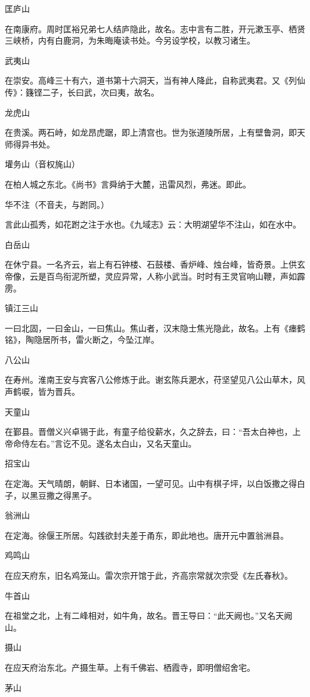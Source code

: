 \documentclass[a4paper,12pt,UTF8,twoside]{ctexbook}
\begin{document}
匡庐山

在南康府。周时匡裕兄弟七人结庐隐此，故名。志中言有二胜，开元漱玉亭、栖贤三峡桥，内有白鹿洞，为朱晦庵读书处。今另设学校，以教习诸生。

武夷山

在崇安。高峰三十有六，道书第十六洞天，当有神人降此，自称武夷君。又《列仙传》：籛铿二子，长曰武，次曰夷，故名。

龙虎山

在贵溪。两石峙，如龙昂虎踞，即上清宫也。世为张道陵所居，上有壁鲁洞，即天师得异书处。

壦务山（音权旄山）

在柏人城之东北。《尚书》言舜纳于大麓，迅雷风烈，弗迷。即此。

华不注（不音夫，与跗同。）

言此山孤秀，如花跗之注于水也。《九域志》云：大明湖望华不注山，如在水中。

白岳山

在休宁县。一名齐云，岩上有石钟楼、石鼓楼、香炉峰、烛台峰，皆奇景。上供玄帝像，云是百鸟衔泥所塑，灵应异常，人称小武当。时时有王灵官响山鞭，声如霹雳。

镇江三山

一曰北固，一曰金山，一曰焦山。焦山者，汉末隐士焦光隐此，故名。上有《瘗鹤铭》，陶隐居所书，雷火断之，今坠江岸。

八公山

在寿州。淮南王安与宾客八公修炼于此。谢玄陈兵淝水，苻坚望见八公山草木，风声鹤唳，皆为晋兵。

天童山

在鄞县。晋僧义兴卓锡于此，有童子给役薪水，久之辞去，曰：“吾太白神也，上帝命侍左右。”言讫不见。遂名太白山，又名天童山。

招宝山

在定海。天气晴朗，朝鲜、日本诸国，一望可见。山中有棋子坪，以白饭撒之得白子，以黑豆撒之得黑子。

翁洲山

在定海。徐偃王所居。勾践欲封夫差于甬东，即此地也。唐开元中置翁洲县。

鸡鸣山

在应天府东，旧名鸡笼山。雷次宗开馆于此，齐高宗常就次宗受《左氏春秋》。

牛首山

在祖堂之北，上有二峰相对，如牛角，故名。晋王导曰：“此天阙也。”又名天阙山。

摄山

在应天府治东北。产摄生草。上有千佛岩、栖霞寺，即明僧绍舍宅。

茅山
\end{document}
